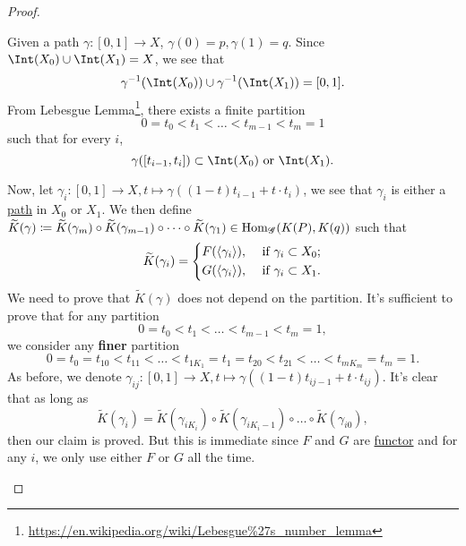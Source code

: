 \begin{proof}
\begin{itemize}
		      Given a path \(\gamma \colon [0, 1]\to X\), \(\gamma (0) = p, \gamma (1) = q\). Since \(\Int (X_0) \cup \Int (X_1) = X\), we see that
		      \[
			      \gamma ^{-1} (\Int (X_0)) \cup \gamma ^{-1} (\Int (X_1)) = [0, 1].
		      \]
		      From Lebesgue Lemma\footnote{\url{https://en.wikipedia.org/wiki/Lebesgue\%27s_number_lemma}}, there exists a finite partition
		      \[
			      0 = t_0 < t_1 < \dots <t_{m-1} < t_{m} = 1
		      \]
		      such that for every \(i\),
		      \[
			      \gamma ([t_{i-1}, t_{i} ])\subset \Int (X_0) \text{ or } \Int (X_1) .
		      \]
		      \begin{figure}[H]
			      \centering
			      \label{fig:pf:thm:Seifert-Van-Kampen-Theorem-on-groupoid}
		      \end{figure}
		      Now, let \(\gamma _{i} \colon [0, 1]\to X, t\mapsto \gamma ((1-t)t_{i-1}+t\cdot t_{i} )\), we see that \(\gamma _{i} \) is either a \hyperref[def:path]{path} in \(X_0\) or \(X_1\).
		      We then define \(\widetilde{K} (\gamma )\coloneqq \widetilde{K} (\gamma _{m} )\circ \widetilde{K} (\gamma _{m-1}) \circ \dots \circ \widetilde{K} (\gamma _1)\in \operatorname{Hom} _{\mathscr{G} }(K(P), K(q)) \)
		      such that
		      \[
			      \widetilde{K} (\gamma _{i} ) = \begin{dcases}
				      F(\left< \gamma _{i} \right> ), & \text{ if } \gamma _{i} \subset X_0 ; \\
				      G(\left< \gamma _{i} \right> ), & \text{ if } \gamma _{i} \subset X_1 .
			      \end{dcases}
		      \]
		      We need to prove that \(\widetilde{K} (\gamma )\) does not depend on the partition. It's sufficient to prove that for any partition
		      \[
			      0 = t_0 < t_1 < \dots <t_{m-1} < t_{m} = 1,
		      \]
		      we consider any \textbf{finer} partition
		      \[
			      0 = t_0= t_{10}< t_{11} <\dots < t_{1K_1}= t_1 = t_{20} <t_{21}<\dots < t_{mK_{m} } = t_{m} = 1.
		      \]
		      As before, we denote \(\gamma _{ij}\colon [0, 1]\to X, t\mapsto \gamma ((1-t)t_{i j-1} + t\cdot t_{ij} )\). It's clear that as long as
		      \[
			      \widetilde{K} (\gamma _{i} ) = \widetilde{K} (\gamma _{i K_{i} })\circ \widetilde{K} (\gamma _{i K_{i}-1 })\circ \dots \circ \widetilde{K} (\gamma _{i 0}),
		      \]
		      then our claim is proved. But this is immediate since \(F\) and \(G\) are \hyperref[def:functor]{functor} and for any \(i\), we only use either \(F\) or \(G\) all the time.


\end{itemize}
\end{proof}
